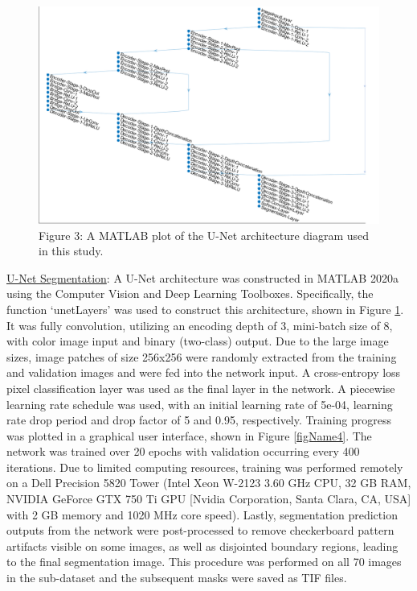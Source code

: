 \documentclass[conference]{IEEEtran}
\begin{document}
\begin{figure}[h]
\centering
\includegraphics[scale=0.25]{Slide3.PNG}
\caption{Figure 3: A MATLAB plot of the U-Net architecture diagram used in this study.}
\label{figName3}
\end{figure}

\ul{U-Net Segmentation}: A U-Net architecture was constructed in MATLAB 2020a using the Computer Vision and Deep Learning Toolboxes. Specifically, the function ‘unetLayers’ was used to construct this architecture, shown in Figure \ref{figName3}. It was fully convolution, utilizing an encoding depth of 3, mini-batch size of 8, with color image input and binary (two-class) output. Due to the large image sizes, image patches of size 256x256 were randomly extracted from the training and validation images and were fed into the network input. A cross-entropy loss pixel classification layer was used as the final layer in the network. A piecewise learning rate schedule was used, with an initial learning rate of 5e-04, learning rate drop period and drop factor of 5 and 0.95, respectively. Training progress was plotted in a graphical user interface, shown in Figure \ref{figName4}.  The network was trained over 20 epochs with validation occurring every 400 iterations. Due to limited computing resources, training was performed remotely on a Dell Precision 5820 Tower (Intel Xeon W-2123 3.60 GHz CPU, 32 GB RAM, NVIDIA GeForce GTX 750 Ti GPU [Nvidia Corporation, Santa Clara, CA, USA] with 2 GB memory and 1020 MHz core speed). Lastly, segmentation prediction outputs from the network were post-processed to remove checkerboard pattern artifacts visible on some images, as well as disjointed boundary regions, leading to the final segmentation image. This procedure was performed on all 70 images in the sub-dataset and the subsequent masks were saved as TIF files. 
\end{document}
